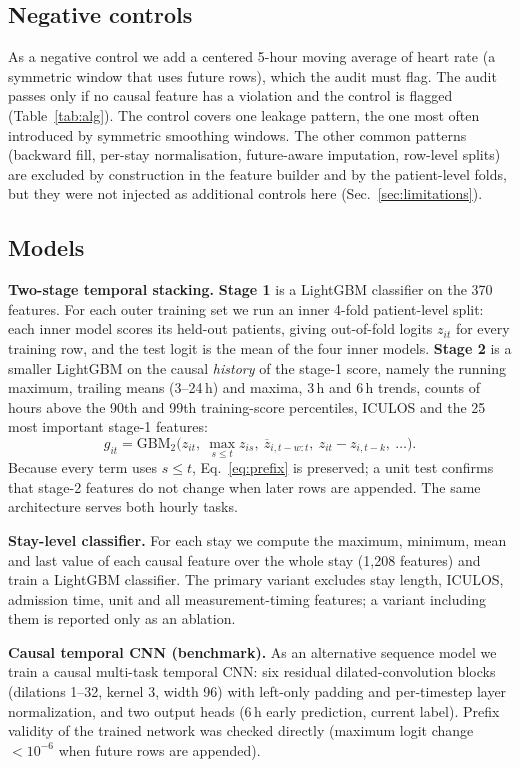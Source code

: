 \documentclass[preprint,12pt]{elsarticle}
\begin{document}
\subsection{Negative controls}
As a negative control we add a centered 5-hour moving average of heart rate (a symmetric window that uses future rows), which the audit must flag. The audit passes only if no causal feature has a violation and the control is flagged (Table~\ref{tab:alg}). The control covers one leakage pattern, the one most often introduced by symmetric smoothing windows. The other common patterns (backward fill, per-stay normalisation, future-aware imputation, row-level splits) are excluded by construction in the feature builder and by the patient-level folds, but they were not injected as additional controls here (Sec.~\ref{sec:limitations}).

\subsection{Models}
\textbf{Two-stage temporal stacking.} \textbf{Stage 1} is a LightGBM classifier \cite{ke2017} on the 370 features. For each outer training set we run an inner 4-fold patient-level split: each inner model scores its held-out patients, giving out-of-fold logits $z_{it}$ for every training row, and the test logit is the mean of the four inner models. \textbf{Stage 2} is a smaller LightGBM on the causal \emph{history} of the stage-1 score, namely the running maximum, trailing means (3--24\,h) and maxima, 3\,h and 6\,h trends, counts of hours above the 90th and 99th training-score percentiles, ICULOS and the 25 most important stage-1 features:
\begin{equation}
g_{it} = \mathrm{GBM}_2\!\big(z_{it},\ \max_{s\le t}z_{is},\ \overline{z}_{i,t-w:t},\ z_{it}-z_{i,t-k},\ \dots\big).
\end{equation}
Because every term uses $s\le t$, Eq.~\eqref{eq:prefix} is preserved; a unit test confirms that stage-2 features do not change when later rows are appended. The same architecture serves both hourly tasks.

\textbf{Stay-level classifier.} For each stay we compute the maximum, minimum, mean and last value of each causal feature over the whole stay (1{,}208 features) and train a LightGBM classifier. The primary variant excludes stay length, ICULOS, admission time, unit and all measurement-timing features; a variant including them is reported only as an ablation.

\textbf{Causal temporal CNN (benchmark).} As an alternative sequence model we train a causal multi-task temporal CNN: six residual dilated-convolution blocks (dilations 1--32, kernel 3, width 96) with left-only padding and per-timestep layer normalization, and two output heads (6\,h early prediction, current label). Prefix validity of the trained network was checked directly (maximum logit change $<10^{-6}$ when future rows are appended).
\end{document}
